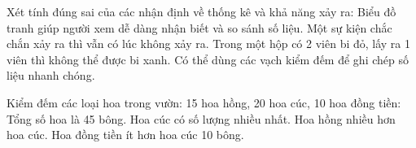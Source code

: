 \begin{ex} %
Xét tính đúng sai của các nhận định về thống kê và khả năng xảy ra:
\choiceTF
{\True Biểu đồ tranh giúp người xem dễ dàng nhận biết và so sánh số liệu.}
{Một sự kiện chắc chắn xảy ra thì vẫn có lúc không xảy ra.}
{\True Trong một hộp có 2 viên bi đỏ, lấy ra 1 viên thì không thể được bi xanh.}
{\True Có thể dùng các vạch kiểm đếm để ghi chép số liệu nhanh chóng.}
\end{ex}

\begin{ex} %
Kiểm đếm các loại hoa trong vườn: 15 hoa hồng, 20 hoa cúc, 10 hoa đồng tiền:
\choiceTF
{\True Tổng số hoa là 45 bông.}
{\True Hoa cúc có số lượng nhiều nhất.}
{Hoa hồng nhiều hơn hoa cúc.}
{\True Hoa đồng tiền ít hơn hoa cúc 10 bông.}
\end{ex}

